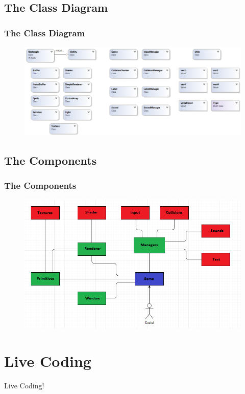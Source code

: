 \documentclass{beamer}
\begin{document}
\subsection{The Class Diagram}
\begin{frame}
\frametitle{The Class Diagram}
\begin{figure}
\includegraphics[width=\textwidth,height=0.7\textheight]{ClassDiagram}
\end{figure}
\end{frame}

\subsection{The Components}
\begin{frame}
\frametitle{The Components}
\begin{figure}
\includegraphics[width=\textwidth,height=0.7\textheight]{Studious-Engine_Diagram}
\end{figure}
\end{frame}

\section{Live Coding}
\begin{frame}
\Huge{\centerline{Live Coding!}}
\end{frame}
\end{document}
